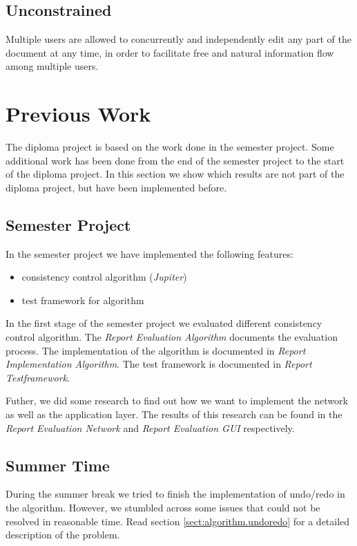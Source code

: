 \subsection{Unconstrained} 
Multiple users are allowed to concurrently and
independently edit any part of the document at any time, in order to 
facilitate free and natural information flow among multiple users.



\section{Previous Work}
\label{sect:overview.previouswork}

The diploma project is based on the work done in the semester project. Some
additional work has been done from the end of the semester
project to the start of the diploma project. In this section we show which
results are not part of the diploma project, but have been implemented
before.

\subsection{Semester Project}
In the semester project we have implemented the following features:
\begin{itemize}
 \item consistency control algorithm (\emph{Jupiter})
 \item test framework for algorithm
\end{itemize}

In the first stage of the semester project we evaluated different
consistency control algorithm. The \emph{Report Evaluation Algorithm}
documents the evaluation process. The implementation of the
algorithm is documented in \emph{Report Implementation Algorithm}. The
test framework is documented in \emph{Report Testframework}.

Futher, we did some research to find out how we want to implement the
network as well as the application layer. The results of this research
can be found in the \emph{Report Evaluation Network} and 
\emph{Report Evaluation GUI} respectively.


\subsection{Summer Time}
During the summer break we tried to finish the implementation of undo/redo
in the algorithm. However, we stumbled across some issues that could not
be resolved in reasonable time. Read section \ref{sect:algorithm.undoredo} for
a detailed description of the problem.

